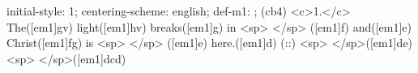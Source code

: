 initial-style: 1;
centering-scheme: english;
def-m1: \grealign;
(cb4) <c>1.</c> The([em1]gv) light([em1]hv) breaks([em1]g) in <sp> </sp> ([em1]f) and([em1]e) Christ([em1]fg) is <sp> </sp> ([em1]e) here.([em1]d) (::) <sp> </sp>([em1]de)<sp> </sp>([em1]dcd)